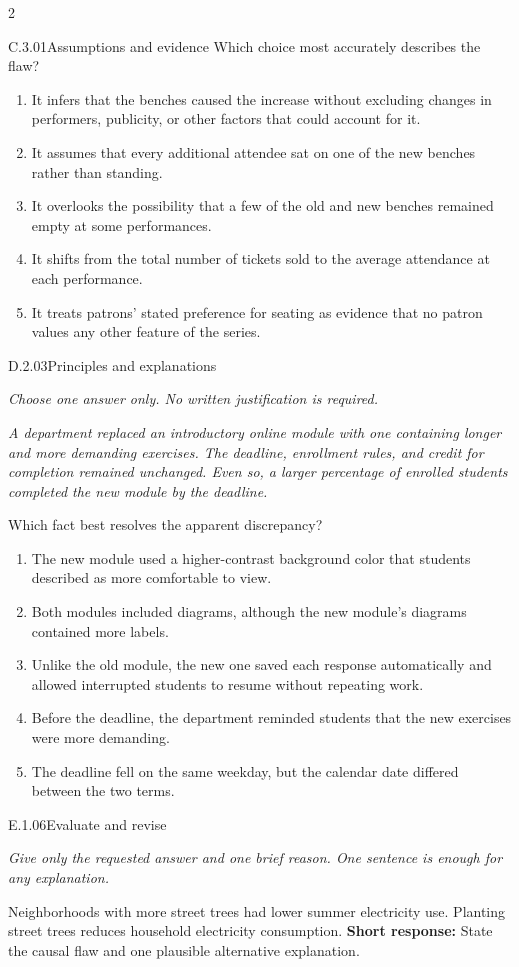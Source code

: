 \documentclass[9pt]{extarticle}
\newcommand{\choice}[1]{\item #1}
\begin{document}
\begin{multicols}{2}
\begin{DenseCoreProblem}{C.3.01}{Assumptions and evidence}
Which choice most accurately describes the flaw?
\begin{enumerate}[label=(\alph*)]
  \choice{It infers that the benches caused the increase without excluding changes in performers, publicity, or other factors that could account for it.}
  \choice{It assumes that every additional attendee sat on one of the new benches rather than standing.}
  \choice{It overlooks the possibility that a few of the old and new benches remained empty at some performances.}
  \choice{It shifts from the total number of tickets sold to the average attendance at each performance.}
  \choice{It treats patrons' stated preference for seating as evidence that no patron values any other feature of the series.}
\end{enumerate}
\end{DenseCoreProblem}
\begin{DenseCoreProblem}{D.2.03}{Principles and explanations}
{\scriptsize\textit{Choose one answer only. No written justification is required.}\par}
\emph{A department replaced an introductory online module with one containing longer and more demanding exercises. The deadline, enrollment rules, and credit for completion remained unchanged. Even so, a larger percentage of enrolled students completed the new module by the deadline.}

Which fact best resolves the apparent discrepancy?
\begin{enumerate}[label=(\alph*)]
  \choice{The new module used a higher-contrast background color that students described as more comfortable to view.}
  \choice{Both modules included diagrams, although the new module's diagrams contained more labels.}
  \choice{Unlike the old module, the new one saved each response automatically and allowed interrupted students to resume without repeating work.}
  \choice{Before the deadline, the department reminded students that the new exercises were more demanding.}
  \choice{The deadline fell on the same weekday, but the calendar date differed between the two terms.}
\end{enumerate}
\end{DenseCoreProblem}
\begin{DenseCoreProblem}{E.1.06}{Evaluate and revise}
{\scriptsize\textit{Give only the requested answer and one brief reason. One sentence is enough for any explanation.}\par}
Neighborhoods with more street trees had lower summer electricity use. Planting street trees reduces household electricity consumption.
\textbf{Short response:} State the causal flaw and one plausible alternative explanation.
\end{DenseCoreProblem}
\end{multicols}
\end{document}

